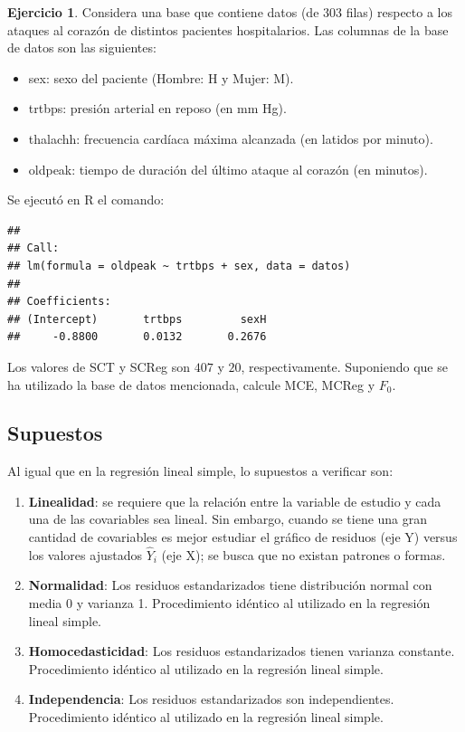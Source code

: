 \documentclass[
  11pt,
]{book}
\providecommand{\tightlist}{%
  \setlength{\itemsep}{0pt}\setlength{\parskip}{0pt}}
\theoremstyle{definition}
\theoremstyle{definition}
\theoremstyle{definition}
\newtheorem{exercise}{Ejercicio}[chapter]
\theoremstyle{definition}
\theoremstyle{remark}
\begin{document}
\begin{exercise}
Considera una base que contiene datos (de 303 filas) respecto a los ataques al corazón de distintos pacientes hospitalarios. Las columnas de la base de datos son las siguientes:

\begin{itemize}
\tightlist
\item
  sex: sexo del paciente (Hombre: H y Mujer: M).
\item
  trtbps: presión arterial en reposo (en mm Hg).
\item
  thalachh: frecuencia cardíaca máxima alcanzada (en latidos por minuto).
\item
  oldpeak: tiempo de duración del último ataque al corazón (en minutos).
\end{itemize}

Se ejecutó en R el comando:

\begin{verbatim}
## 
## Call:
## lm(formula = oldpeak ~ trtbps + sex, data = datos)
## 
## Coefficients:
## (Intercept)       trtbps         sexH  
##     -0.8800       0.0132       0.2676
\end{verbatim}

Los valores de SCT y SCReg son \(407\) y \(20\), respectivamente. Suponiendo que se ha utilizado la base de datos mencionada, calcule MCE, MCReg y \(F_0\).
\end{exercise}

\subsection{Supuestos}\label{supuestos-1}

Al igual que en la regresión lineal simple, lo supuestos a verificar son:

\begin{enumerate}
\def\labelenumi{\arabic{enumi}.}
\item
  \textbf{Linealidad}: se requiere que la relación entre la variable de estudio y cada una de las covariables sea lineal. Sin embargo, cuando se tiene una gran cantidad de covariables es mejor estudiar el gráfico de residuos (eje Y) versus los valores ajustados \(\widehat{Y}_i\) (eje X); se busca que no existan patrones o formas.
\item
  \textbf{Normalidad}: Los residuos estandarizados tiene distribución normal con media 0 y varianza 1. Procedimiento idéntico al utilizado en la regresión lineal simple.
\item
  \textbf{Homocedasticidad}: Los residuos estandarizados tienen varianza constante. Procedimiento idéntico al utilizado en la regresión lineal simple.
\item
  \textbf{Independencia}: Los residuos estandarizados son independientes. Procedimiento idéntico al utilizado en la regresión lineal simple.
\end{enumerate}
\end{document}

